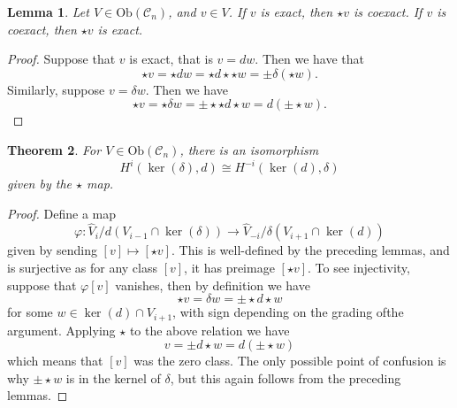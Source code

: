 \documentclass{amsart}
\newcommand{\ra}{\rightarrow}
\newtheorem{theorem}{Theorem}
\newtheorem{lemma}[theorem]{Lemma}
\theoremstyle{definition}
\begin{document}
\begin{lemma}
Let $V \in \mathrm{Ob}(\mathscr{C}_n)$, and $v \in V$.    If $v$ is exact, then $\star v$ is coexact. If $v$ is coexact, then $\star v$ is exact.
\end{lemma}
\begin{proof}
    Suppose that $v$ is exact, that is $v= dw$. Then we have that
    \begin{equation*}
        \star v = \star dw = \star d\star \star w = \pm \delta(\star w).
    \end{equation*}
    Similarly, suppose $v= \delta w$. Then we have 
    \begin{equation*}
        \star v = \star \delta w= \pm \star \star d\star w = d(\pm \star w).
    \end{equation*}
\end{proof}
\begin{theorem}
   For $V \in \mathrm{Ob}(\mathscr{C}_n)$, there is an isomorphism 
    \begin{equation*}
        H^i(\ker(\delta),d) \cong H^{-i}(\ker(d), \delta)
    \end{equation*}
    given by the $\star$ map.
\end{theorem}
\begin{proof}
    Define a map 
    \begin{equation*}
        \varphi:\widehat{V}_i/d(V_{i-1}\cap \ker(\delta)) \ra \widehat{V}_{-i}/\delta(V_{i+1}\cap \ker(d))
    \end{equation*}
    given by sending $[v] \mapsto [\star v]$. This is well-defined by the preceding lemmas, and is surjective as for any class $[v]$, it has preimage $[\star v]$. To see injectivity, suppose that $\varphi [v]$ vanishes, then by definition we have
    \begin{equation*}
        \star v = \delta w = \pm \star  d \star w
    \end{equation*}
    for some $w \in \ker(d) \cap V_{i+1}$, with sign depending on the grading ofthe argument. Applying $\star$ to the above relation we have
    \begin{equation*}
        v= \pm d \star w = d( \pm \star w)
    \end{equation*}
    which means that $[v]$ was the zero class. The only possible point of confusion is why $\pm \star w$ is in the kernel of $\delta$, but this again follows from the preceding lemmas.
\end{proof}
\end{document}
